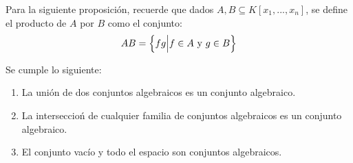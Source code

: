 \documentclass[12pt]{report}
\newcounter{it}
\theoremstyle{largebreak}
\begin{document}
    Para la siguiente proposición, recuerde que dados $A,B\subseteq K[x_1,...,x_n]$, se define el producto de $A$ por $B$ como el conjunto:
    \begin{equation*}
        AB=\left\{fg\Big|f\in A\textup{ y }g\in B \right\}
    \end{equation*}
    
    \begin{propo}
        Se cumple lo siguiente:
        \begin{enumerate}[label=(\textit{\alph*})]
            \item La unión de dos conjuntos algebraicos es un conjunto algebraico.
            \item La interseccioń de cualquier familia de conjuntos algebraicos es un conjunto algebraico.
            \item El conjunto vacío y todo el espacio son conjuntos algebraicos.
        \end{enumerate}
    \end{propo}
\end{document}
